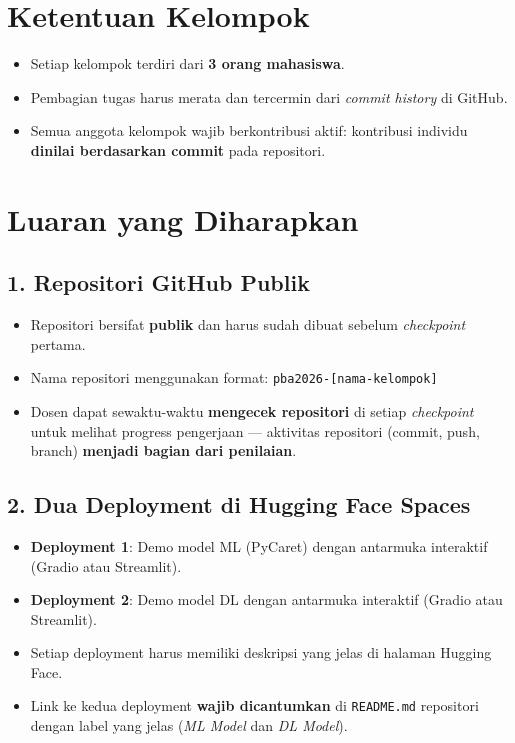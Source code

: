 \documentclass[11pt,a4paper]{article}
\begin{document}
\section{Ketentuan Kelompok}

\begin{itemize}
  \item Setiap kelompok terdiri dari \textbf{3 orang mahasiswa}.
  \item Pembagian tugas harus merata dan tercermin dari \textit{commit history} di GitHub.
  \item Semua anggota kelompok wajib berkontribusi aktif: kontribusi individu \textbf{dinilai berdasarkan commit} pada repositori.
\end{itemize}

\section{Luaran yang Diharapkan}

\subsection{1. Repositori GitHub Publik}

\begin{itemize}
  \item Repositori bersifat \textbf{publik} dan harus sudah dibuat sebelum \textit{checkpoint} pertama.
  \item Nama repositori menggunakan format: \texttt{pba2026-[nama-kelompok]}
  \item Dosen dapat sewaktu-waktu \textbf{mengecek repositori} di setiap \textit{checkpoint} untuk melihat progress pengerjaan --- aktivitas repositori (commit, push, branch) \textbf{menjadi bagian dari penilaian}.
\end{itemize}

\subsection{2. Dua Deployment di Hugging Face Spaces}

\begin{itemize}
  \item \textbf{Deployment 1}: Demo model ML (PyCaret) dengan antarmuka interaktif (Gradio atau Streamlit).
  \item \textbf{Deployment 2}: Demo model DL dengan antarmuka interaktif (Gradio atau Streamlit).
  \item Setiap deployment harus memiliki deskripsi yang jelas di halaman Hugging Face.
  \item Link ke kedua deployment \textbf{wajib dicantumkan} di \texttt{README.md} repositori dengan label yang jelas (\textit{ML Model} dan \textit{DL Model}).
\end{itemize}
\end{document}
